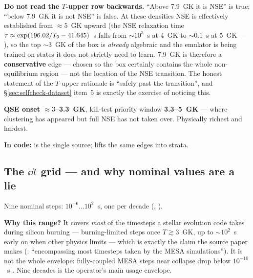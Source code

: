 \begin{warn}
\textbf{Do not read the $T$-upper row backwards.} ``Above 7.9~GK it is NSE'' is
true; ``below 7.9~GK it is not NSE'' is false. At these densities NSE is
effectively established from $\approx5$~GK upward (the NSE relaxation time
$\tau \approx \exp(196.02/T_{9} - 41.645)$~s falls from ${\sim}10^{3}$~s at 4~GK
to ${\sim}0.1$~s at 5~GK --- \citealt{calder2007}), so the top ${\sim}3$~GK of
the box is \emph{already} algebraic and the emulator is being trained on states
it does not strictly need to learn. 7.9~GK is therefore a \textbf{conservative}
edge --- chosen so the box certainly contains the whole non-equilibrium region
--- not the location of the NSE transition. The honest statement of the
$T$-upper rationale is ``safely past the transition'', and
\S\ref{sec:selfcheck-dataset} item~5 is exactly the exercise of noticing this.
\end{warn}

\textbf{QSE onset $\approx 3$--3.3~GK}, kill-test priority window
\textbf{3.3--5~GK} --- where clustering has appeared but full NSE has not taken
over. Physically richest and hardest.

\begin{repopointer}
\textbf{In code:}  is the single source;
 lifts the same edges into strata.
\end{repopointer}

\subsection{The \texorpdfstring{$\dd t$}{dt} grid --- and why nominal values are a
  lie}
\label{sec:dtgrid}

Nine nominal steps: $10^{-6} \ldots 10^{2}$~s, one per decade
(, ).

\textbf{Why this range?} It covers \emph{most} of the timesteps a stellar
evolution code takes during silicon burning --- burning-limited steps once
$T \gtrsim 3$~GK, up to ${\sim}10^{2}$~s early on when other physics limits ---
which is exactly the claim the source paper makes (\citealt{grichener2025}:
``encompassing most timesteps taken by the MESA simulations''). It is not the
whole envelope: fully-coupled MESA steps near collapse drop below
$10^{-10}$~s \citep{jermyn2023}. Nine decades is the operator's main usage
envelope.

